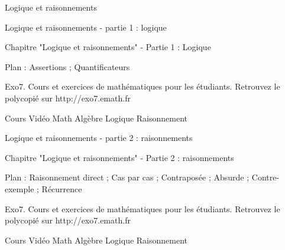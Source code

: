 
   Logique et raisonnements





Logique et raisonnements - partie 1 : logique 


Chapitre "Logique et raisonnements" - Partie 1 : Logique

Plan : Assertions ; Quantificateurs

Exo7. Cours et exercices de mathématiques pour les étudiants.
Retrouvez le polycopié sur http://exo7.emath.fr


Cours Vidéo Math Algèbre Logique Raisonnement 





Logique et raisonnements - partie 2 : raisonnements 


Chapitre "Logique et raisonnements" - Partie 2 : raisonnements

Plan : Raisonnement direct ; Cas par cas ; Contraposée ; Absurde ; Contre-exemple ; Récurrence

Exo7. Cours et exercices de mathématiques pour les étudiants.
Retrouvez le polycopié sur http://exo7.emath.fr


Cours Vidéo Math Algèbre Logique Raisonnement 



